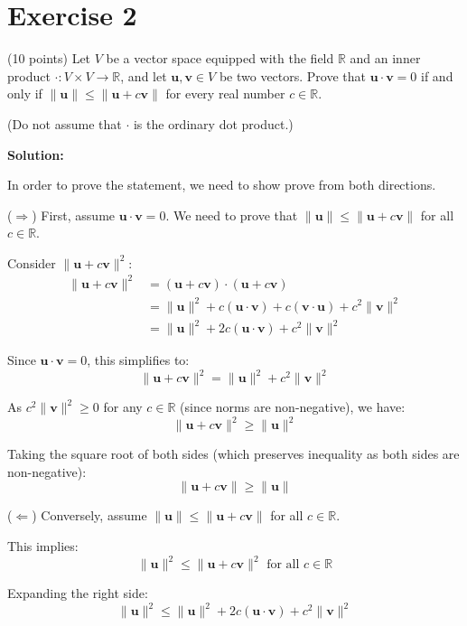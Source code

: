 \documentclass{article}
\begin{document}
\newpage

\section*{Exercise 2}
(10 points) Let $V$ be a vector space equipped with the field $\mathbb{R}$ and an inner product $\cdot: V \times V \to \mathbb{R}$, and let $\mathbf{u}, \mathbf{v} \in V$ be two vectors. Prove that $\mathbf{u} \cdot \mathbf{v} = 0$ if and only if $\|\mathbf{u}\| \leq \|\mathbf{u} + c\mathbf{v}\|$ for every real number $c \in \mathbb{R}$.

(Do not assume that $\cdot$ is the ordinary dot product.)

\textbf{Solution:}

In order to prove the statement, we need to show prove from both directions.

($\Rightarrow$) First, assume $\mathbf{u} \cdot \mathbf{v} = 0$. We need to prove that $\|\mathbf{u}\| \leq \|\mathbf{u} + c\mathbf{v}\|$ for all $c \in \mathbb{R}$.

Consider $\|\mathbf{u} + c\mathbf{v}\|^2$:
\begin{align*}
\|\mathbf{u} + c\mathbf{v}\|^2 &= (\mathbf{u} + c\mathbf{v}) \cdot (\mathbf{u} + c\mathbf{v}) \\
&= \|\mathbf{u}\|^2 + c(\mathbf{u} \cdot \mathbf{v}) + c(\mathbf{v} \cdot \mathbf{u}) + c^2\|\mathbf{v}\|^2 \\
&= \|\mathbf{u}\|^2 + 2c(\mathbf{u} \cdot \mathbf{v}) + c^2\|\mathbf{v}\|^2
\end{align*}

Since $\mathbf{u} \cdot \mathbf{v} = 0$, this simplifies to:
\[\|\mathbf{u} + c\mathbf{v}\|^2 = \|\mathbf{u}\|^2 + c^2\|\mathbf{v}\|^2\]

As $c^2\|\mathbf{v}\|^2 \geq 0$ for any $c \in \mathbb{R}$ (since norms are non-negative), we have:
\[\|\mathbf{u} + c\mathbf{v}\|^2 \geq \|\mathbf{u}\|^2\]

Taking the square root of both sides (which preserves inequality as both sides are non-negative):
\[\|\mathbf{u} + c\mathbf{v}\| \geq \|\mathbf{u}\|\]

($\Leftarrow$) Conversely, assume $\|\mathbf{u}\| \leq \|\mathbf{u} + c\mathbf{v}\|$ for all $c \in \mathbb{R}$.

This implies:
\[\|\mathbf{u}\|^2 \leq \|\mathbf{u} + c\mathbf{v}\|^2 \text{ for all } c \in \mathbb{R}\]

Expanding the right side:
\[\|\mathbf{u}\|^2 \leq \|\mathbf{u}\|^2 + 2c(\mathbf{u} \cdot \mathbf{v}) + c^2\|\mathbf{v}\|^2\]
\end{document}
